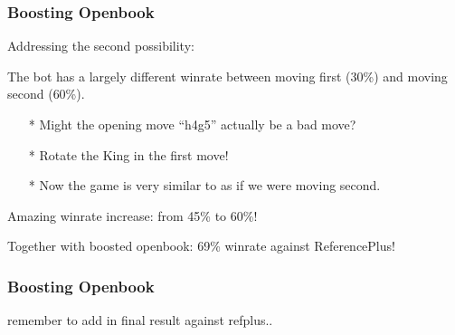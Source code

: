 \documentclass[10pt]{beamer}
\begin{document}
	\begin{frame}
		\frametitle{Boosting Openbook}
		
		Addressing the second possibility:\pause
		
		The bot has a largely different winrate between moving first (\textcolor{dred}{30\%}) and moving second (\textcolor{fgreen}{60\%}).\pause
		
		\begin{itemize}
		\item[*] Might the opening move ``h4g5'' actually be a bad move?\pause
		\item[*] Rotate the King in the first move!\pause
		\item[*] Now the game is very similar to as if we were moving second.\pause
		\end{itemize}
		
		Amazing winrate increase: from \textcolor{dred}{45\%} to \textcolor{fgreen}{60\%}!\pause
		
		Together with boosted openbook: \textcolor{fgreen}{69\%} winrate against ReferencePlus!
	\end{frame}
	
	\begin{frame}
		\frametitle{Boosting Openbook}
		
		remember to add in final result against refplus..
	\end{frame}
	
	
	
		
\end{document}
